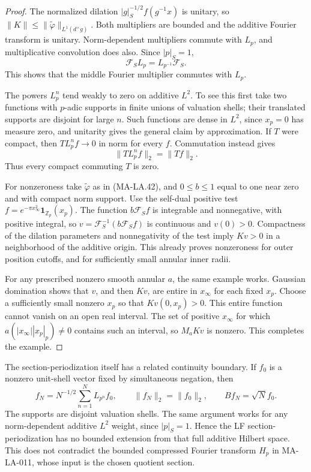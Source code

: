\begin{proof}
The normalized dilation $|g|_S^{-1/2}f(g^{-1}x)$ is unitary,
so $\|K\|\le\|\widetilde\varphi\|_{L^1(d^\times g)}$.
Both multipliers are bounded and the additive Fourier transform
is unitary.  Norm-dependent multipliers commute with $L_p$,
and multiplicative convolution does also.  Since $|p|_S=1$,
\[
           \mathcal F_S L_p=L_{p^{-1}}\mathcal F_S.
 \tag{MA-LA.56}
\]
This shows that the middle Fourier multiplier commutes with $L_p$.

The powers $L_p^n$ tend weakly to zero on additive $L^2$.
To see this first take two functions with $p$-adic supports
in finite unions of valuation shells; their translated supports
are disjoint for large $n$.  Such functions are dense in $L^2$,
since $x_p=0$ has measure zero, and unitarity gives the general
claim by approximation.  If $T$ were compact, then
$TL_p^nf\to0$ in norm for every $f$.  Commutation instead gives
\[
                     \|TL_p^nf\|_2=\|Tf\|_2.
 \tag{MA-LA.57}
\]
Thus every compact commuting $T$ is zero.

For nonzeroness take $\widetilde\varphi$ as in (MA-LA.42),
and $0\le b\le1$ equal to one near zero and with compact
norm support.  Use the self-dual positive test
$f=e^{-\pi x_\infty^2}\mathbf1_{\mathbb Z_p}(x_p)$.
The function $b\mathcal F_Sf$ is integrable and nonnegative,
with positive integral, so
$v=\mathcal F_S^{-1}(b\mathcal F_S f)$ is continuous and
$v(0)>0$.  Compactness of the dilation parameters and
nonnegativity of the test imply $Kv>0$ in a neighborhood
of the additive origin.  This already proves nonzeroness
for outer position cutoffs, and for sufficiently small
annular inner radii.

For any prescribed nonzero smooth annular $a$, the same
example works.  Gaussian domination shows that $v$, and
then $Kv$, are entire in $x_\infty$ for each fixed $x_p$.
Choose a sufficiently small nonzero $x_p$ so that
$Kv(0,x_p)>0$.  This entire function cannot vanish on an
open real interval.  The set of positive $x_\infty$ for
which $a(|x_\infty||x_p|_p)\ne0$ contains such an interval,
so $M_aKv$ is nonzero.  This completes the example.
\end{proof}

The section-periodization itself has a related continuity
boundary.  If $f_0$ is a nonzero unit-shell vector fixed by
simultaneous negation, then
\[
 f_N=N^{-1/2}\sum_{n=1}^NL_{p^n}f_0,
 \qquad \|f_N\|_2=\|f_0\|_2,
 \qquad Bf_N=\sqrt N f_0.
 \tag{MA-LA.58}
\]
The supports are disjoint valuation shells.  The same argument
works for any norm-dependent additive $L^2$ weight, since
$|p|_S=1$.  Hence the LF section-periodization has no bounded
extension from that full additive Hilbert space.  This does
not contradict the bounded compressed Fourier transform
$H_p$ in MA-LA-011, whose input is the chosen quotient section.

